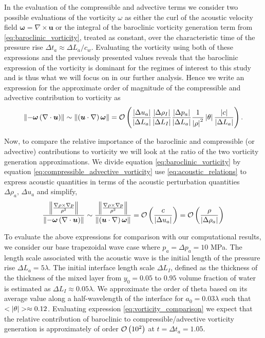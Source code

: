 In the evaluation of the compressible and advective terms we consider
two possible evaluations of the vorticity $\omega$ as either the curl
of the acoustic velocity field $\boldsymbol{\omega}=\nabla\times\boldsymbol{u}$ or
the integral of the baroclinic vorticity generation term from
\eqref{eq:baroclinic_vorticity}, treated as constant, over the
characteristic time of the pressure rise
$\Delta t_a\approx\Delta L_a/c_w$. Evaluating the vorticity using both
of these expressions and the previously presented values reveals that
the baroclinic expression of the vorticity is dominant for
the regimes of interest to this study and is thus what we will focus
on in our further analysis. Hence we write an expression for the
approximate order of magnitude of the compressible and advective
contribution to vorticity as
\begin{align}
  \label{eq:compressible_advective_vorticity}%
  \norm{-\boldsymbol{\omega}\left(\nabla\cdot\boldsymbol{u}\right)}\sim \norm{\left(\boldsymbol{u}\cdot\nabla\right)\boldsymbol{\omega}} = %
  \orderof{%
  \frac{\abs{\Delta u_a}}{\abs{\Delta L_a}} \frac{\abs{\Delta \rho_I}}{\abs{\Delta L_I}}%
  \frac{\abs{\Delta p_a}}{\abs{\Delta L_a}} \frac{1}{\abs{\rho}^2}\abs{\theta}\frac{\abs{c}}{\abs{\Delta L_a}}%
  }.%
\end{align}

Now, to compare the relative importance of the baroclinic and
compressible (or advective) contributions to vorticity we will look at
the ratio of the two vorticity generation approximations. We divide
equation \eqref{eq:baroclinic_vorticity} by equation
\eqref{eq:compressible_advective_vorticity} use
\eqref{eq:acoustic_relations} to express acoustic quantities in terms
of the acoustic perturbation quantities $\Delta \rho_a,\,\Delta u_a$ and simplify,
\begin{align} \label{eq:vorticity_comparison}
  \frac{\norm{\frac{\nabla\rho\times\nabla
  p}{\rho^2}}}{\norm{-\boldsymbol{\omega}\left(\nabla\cdot\boldsymbol{u}\right)}}
  \sim
  \frac{\norm{\frac{\nabla\rho\times\nabla
  p}{\rho^2}}}{\norm{\left(\boldsymbol{u}\cdot\nabla\right)\boldsymbol{\omega}}}
  = \orderof{\frac{c}{\abs{\Delta u_a}}} = \orderof{\frac{\rho}{\abs{\Delta \rho_a}}}%
\end{align}

To evaluate the above expressions for comparison with our computational
results, we consider our base trapezoidal wave case where
$p_a = \Delta p_a = 10$ MPa. The length scale associated with the
acoustic wave is the initial length of the pressure rise
$\Delta L_a=5\lambda$. The initial interface length scale
$\Delta L_I$, defined as the thickness of the thickness of the mixed
layer from $y_0=0.05$ to $0.95$ volume fraction of water is estimated
as $\Delta L_I \approx 0.05\lambda$. We approximate the order of theta
based on its average value along a half-wavelength of the interface
for $a_0=0.03\lambda$ such that
$<\abs{\theta}>\approx0.12$. Evaluating expression
\eqref{eq:vorticity_comparison} we expect that the relative
contribution of baroclinic to compressible/advective vorticity
generation is approximately of order $\mathcal{O}\left(10^2\right)$ at
$t=\Delta t_a=1.05$.

